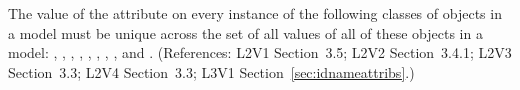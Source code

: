 The value of the  attribute on every instance of the following
classes of objects in a model must be unique across the set of all
 values of all of these objects in a model: \Model,
\FunctionDefinition, \Compartment, \Species, \Reaction, \SpeciesReference,
\ModifierSpeciesReference, \Event, and \Parameter.  (References: L2V1
Section~3.5; L2V2 Section~3.4.1; L2V3 Section~3.3; L2V4 Section~3.3; L3V1
Section~\ref{sec:idnameattribs}.)
